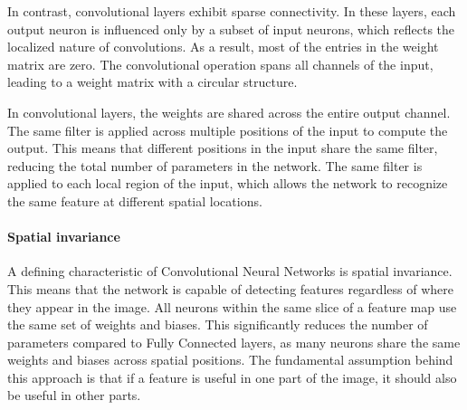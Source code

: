 In contrast, convolutional layers exhibit sparse connectivity.
In these layers, each output neuron is influenced only by a subset of input neurons, which reflects the localized nature of convolutions.
As a result, most of the entries in the weight matrix are zero. 
The convolutional operation spans all channels of the input, leading to a weight matrix with a circular structure.

In convolutional layers, the weights are shared across the entire output channel. 
The same filter is applied across multiple positions of the input to compute the output. 
This means that different positions in the input share the same filter, reducing the total number of parameters in the network. 
The same filter is applied to each local region of the input, which allows the network to recognize the same feature at different spatial locations.

\paragraph*{Spatial invariance}
A defining characteristic of Convolutional Neural Networks is spatial invariance. 
This means that the network is capable of detecting features regardless of where they appear in the image.
All neurons within the same slice of a feature map use the same set of weights and biases.
This significantly reduces the number of parameters compared to Fully Connected layers, as many neurons share the same weights and biases across spatial positions.
The fundamental assumption behind this approach is that if a feature is useful in one part of the image, it should also be useful in other parts. 